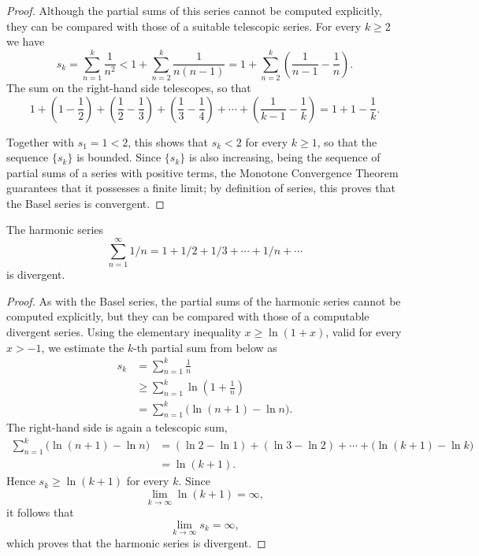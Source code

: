 \begin{proof}
Although the partial sums of this series cannot be computed explicitly, they can be compared with those of a suitable telescopic series. For every $k \geq 2$ we have
\[
s_k = \sum_{n=1}^{k} \frac{1}{n^2} < 1 + \sum_{n=2}^{k} \frac{1}{n(n-1)} = 1 + \sum_{n=2}^{k} \left( \frac{1}{n-1} - \frac{1}{n} \right).
\]
The sum on the right-hand side telescopes, so that
\[
1 + \left(1 - \frac{1}{2}\right) + \left(\frac{1}{2} - \frac{1}{3}\right) + \left(\frac{1}{3} - \frac{1}{4}\right) + \cdots + \left(\frac{1}{k-1} - \frac{1}{k}\right) = 1 + 1 - \frac{1}{k}.
\]

Together with $s_1=1<2$, this shows that $s_k<2$ for every $k\geq1$, so that the sequence $\{s_k\}$ is bounded. Since $\{s_k\}$ is also increasing, being the sequence of partial sums of a series with positive terms, the Monotone Convergence Theorem guarantees that it possesses a finite limit; by definition of series, this proves that the Basel series is convergent.
\end{proof}

\begin{theorem}
The harmonic series
\[
\sum_{n=1}^{\infty} 1/n = 1 + 1/2 + 1/3 + \cdots + 1/n + \cdots
\]
is divergent.
\end{theorem}

\begin{proof}
As with the Basel series, the partial sums of the harmonic series cannot be computed explicitly, but they can be compared with those of a computable divergent series. Using the elementary inequality $x \geq \ln(1 + x)$, valid for every $x>-1$, we estimate the $k$-th partial sum from below as
\[
\begin{aligned}
s_k &= \sum_{n=1}^{k} \frac{1}{n} \\
&\geq \sum_{n=1}^{k} \ln \left(1 + \frac{1}{n}\right) \\
&= \sum_{n=1}^{k} \big( \ln(n+1) - \ln n \big).
\end{aligned}
\]
The right-hand side is again a telescopic sum,
\[
\begin{aligned}
\sum_{n=1}^{k} \big( \ln(n+1) - \ln n \big) &= (\ln 2 - \ln 1) + (\ln 3 - \ln 2) + \cdots + \big(\ln(k+1) - \ln k\big) \\
&= \ln(k+1).
\end{aligned}
\]
Hence $s_k \geq \ln(k+1)$ for every $k$. Since
\[
\lim_{k \to \infty} \ln(k+1) = \infty,
\]
it follows that
\[
\lim_{k \to \infty} s_k = \infty,
\]
which proves that the harmonic series is divergent.
\end{proof}

